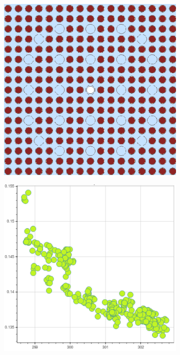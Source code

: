 
\begin{figure}[h!]
\centering
\begin{subfigure}{0.45\textwidth}
  \centering
  \includegraphics[width=0.9\linewidth]{figures/unsupervised/features/assm-16/geometry}
  \caption{}
  \label{fig:chap10-fiss-mean-std-geom}
\end{subfigure}%
\begin{subfigure}{0.45\textwidth}
  \centering
  \includegraphics[width=0.9\linewidth]{figures/unsupervised/features/assm-16/u235-fiss/mean-std/mgxs}

\end{subfigure}
\end{figure}
